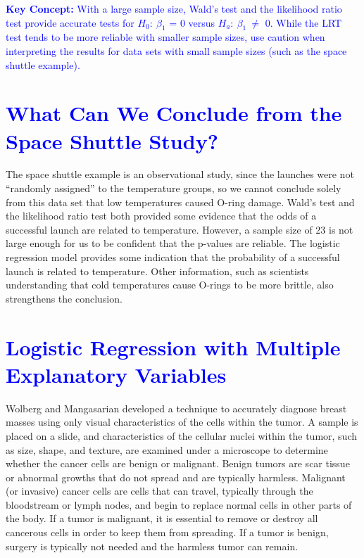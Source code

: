 \documentclass[
]{report}
\begin{document}
\textbf{\textcolor{blue}{Key Concept:}}
\textcolor{blue}{With a large sample size, Wald’s test and the likelihood ratio test provide accurate tests for $\scriptstyle H_0: \  \beta_1$ = 0 versus $\scriptstyle H_a: \  \beta_1 \  \neq$ 0. While the LRT test tends to be more reliable with smaller sample sizes, use caution when interpreting the results for data sets with small sample sizes (such as the space shuttle example).}

\hypertarget{section-66}{%
\section{\texorpdfstring{\textcolor{blue}{ What Can We Conclude from the Space Shuttle Study?}}{}}\label{section-66}}

The space shuttle example is an observational study, since the launches were not ``randomly assigned'' to the temperature groups, so we cannot conclude solely from this data set that low temperatures caused O-ring damage. Wald's test and the likelihood ratio test both provided some evidence that the odds of a successful launch are related to temperature. However, a sample size of 23 is not large enough for us to be confident that the p-values are reliable. The logistic regression model provides some indication that the probability of a successful launch is related to temperature. Other information, such as scientists understanding that cold temperatures cause O-rings to be more brittle, also strengthens the conclusion.

\hypertarget{section-67}{%
\section{\texorpdfstring{\textcolor{blue}{ Logistic Regression with Multiple Explanatory Variables}}{}}\label{section-67}}

Wolberg and Mangasarian developed a technique to accurately diagnose breast masses using only visual characteristics of the cells within the tumor. A sample is placed on a slide, and characteristics of the cellular nuclei within the tumor, such as size, shape, and texture, are examined under a microscope to determine whether the cancer cells are benign or malignant. Benign tumors are scar tissue or abnormal growths that do not spread and are typically harmless. Malignant (or invasive) cancer cells are cells that can travel, typically through the bloodstream or lymph nodes, and begin to replace normal cells in other parts of the body. If a tumor is malignant, it is essential to remove or destroy all cancerous cells in order to keep them from spreading. If a tumor is benign, surgery is typically not needed and the harmless tumor can remain.
\end{document}
